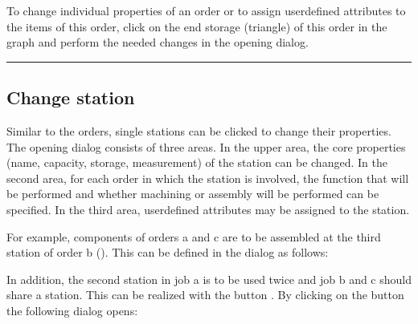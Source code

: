 \documentclass[letterpaper,10pt,english]{sphinxmanual}
\begin{document}

\sphinxAtStartPar
To change individual properties of an order or to assign user\sphinxhyphen{}defined attributes to the items of this order, click on
the end storage (triangle) of this order in the graph and perform the needed changes in the opening dialog.



\bigskip\hrule\bigskip



\subsection{Change station}
\label{\detokenize{source/Defining_processes/defining_processes:change-station}}\label{\detokenize{source/Defining_processes/defining_processes:dp-station}}
\sphinxAtStartPar
Similar to the orders, single stations can be clicked to change their properties. The opening dialog consists of three
areas. In the upper area, the core properties (name, capacity, storage, measurement) of the station can be changed. In
the second area, for each order in which the station is involved, the function that will be performed and whether
machining or assembly will be performed can be specified. In the third area, user\sphinxhyphen{}defined attributes may be assigned to
the station.


\sphinxAtStartPar
For example, components of orders a and c are to be assembled at the third station of order b ({\hyperref[\detokenize{source/Defining_processes/defining_processes:first}]{}}). This
can be defined in the dialog as follows:


\sphinxAtStartPar
In addition, the second station in job a is to be used twice and job b and c should share a station. This can be
realized with the button . By clicking on the button the following dialog opens:
\end{document}
